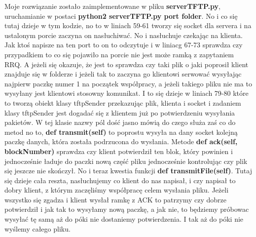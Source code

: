 \documentclass[11pt,a4paper]{article}
\begin{document}
\begin{itemize}
Moje rozwiązanie zostało zaimplementowane w pliku \textbf{serverTFTP.py}, uruchamianie w postaci \textbf{python2 serverTFTP.py port folder}. No i co się tutaj dzieje w tym kodzie, no to w liniach 59-61 tworzy się socket dla servera i na ustalonym porcie zaczyna on nasłuchiwać. No i nasłuchuje czekając na klienta. Jak ktoś napisze na ten port to on to odczytuje i w liniacg 67-73 sprawdza czy przypadkiem to co się pojawiło na porcie nie jest może ramką z zapytaniem RRQ. A jeżeli się okazuje, że jest to sprawdza czy taki plik o jaki poprosił klient znajduje się w folderze i jeżeli tak to zaczyna go klientowi serwować wysyłając najpierw paczkę numer 1 na początek współpracy, a jeżeli takiego pliku nie ma to wysyłany jest klientowi stosowny komunikat. I to się dzieje w liniach 79-80 które to tworzą obiekt klasy tftpSender przekazując plik, klienta i socket i zadaniem klasy tftpSender jest dogadać się z klientem już po potwierdzeniu wysyłania pakietów. W tej klasie nazwy pól dość jasno mówią do czego służa zaś co do metod no to, \textbf{def transmit(self)} to poprostu wysyła na dany socket kolejną paczkę danych, która została  podrzucona do wysłania. Metode \textbf{def ack(self, blockNumber)} sprawdza czy klient potwierdził ten blok, który powinien i jednocześnie ładuje do paczki nową część pliku jednocześnie kontrolując czy plik się jeszcze nie skończył. No i teraz kwestia funkcji \textbf{def transmitFile(self)}. Tutaj się dzieje cała reszta, nasłuchujemy co klient do nas napisał, i czy napisał to dobry klient, z którym zaczęliśmy współpracę celem wysłania pliku. Jeżeli wszystko się zgadza i klient wysłał ramkę z ACK to patrzymy czy dobrze potwierdził i jak tak to wysyłamy nową paczkę, a jak nie, to będziemy próbowac wysyłać tę samą aż do póki nie dostaniemy potwierdzenia. I tak aż do póki nie wyślemy całego pliku.
\end{itemize}
\end{document}
